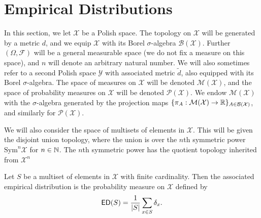 \chapter{Empirical Distributions}

In this section, we let $\mathcal{X}$ be a Polish space. The topology on $\mathcal{X}$ will be generated by a metric $d$,
and we equip $\mathcal{X}$ with its Borel $\sigma$-algebra $\mathcal{B}(\mathcal{X})$. Further $(\Omega, \mathcal{F})$
will be a general measurable space (we do not fix a measure on this space), and $n$ will denote an arbitrary natural number.
We will also sometimes refer to a second Polish space $\mathcal{Y}$ with associated metric $\tilde d$, also equipped with
its Borel $\sigma$-algebra. The space of measures on $\mathcal{X}$ will be denoted $\mathcal{M}(\mathcal{X})$, and the
space of probability measures on $\mathcal{X}$ will be denoted $\mathcal{P}(\mathcal{X})$. We endow $\mathcal{M}(\mathcal{X})$
with the $\sigma$-algebra generated by the projection maps $\{\pi_{A} : \mathcal{M}(\mathcal{X}) \to \mathbb{R}\}_{A \in \mathcal{B}(\mathcal{X})}$,
and similarly for $\mathcal{P}(\mathcal{X})$.

We will also consider the space of multisets of elements in $\mathcal{X}$. This will be given the disjoint union topology, where
the union is over the $n$th symmetric power $\mathrm{Sym}^n \mathcal{X}$ for $n \in \mathbb{N}$. The $n$th symmetric power has the quotient
topology inherited from $\mathcal{X}^n$



\begin{definition}
  \label{def:empiricalDistribution}
  \uses{}
  \notready
  Let $S$ be a multiset of elements in $\mathcal{X}$ with finite cardinality. Then the associated empirical distribution is the probability measure on $\mathcal{X}$ defined by
  \[
  {\sf ED}(S) = \frac{1}{|S|}\sum_{x \in S} \delta_{x}.
  \]
\end{definition}
